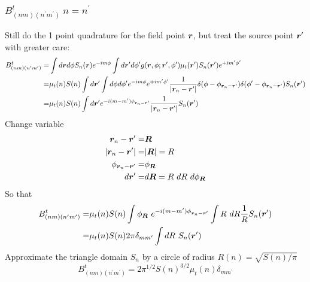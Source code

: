 \documentclass [10pt,letterpaper]{article}
\renewcommand{\vec}{\vectorsym}
\begin{document}
\subsubsection{$B^t_{(n m)(n^\prime m^\prime)} \ n=n^\prime$}
\label{subsub:Btnmnpmp-diagonal}
Still do the 1 point quadrature for the field point $\vec{r}$, but treat the source point $\vec{r}^\prime$ with greater care:
\begin{equation} \label{eq:der-Btnmnpmp-diagonal-1pt-1}
	\begin{split}
		B^t_{(n m)(n^\prime m^\prime)}
		=&
		\int d\vec{r} d\phi
		S_n(\vec{r})
		e^{-i m \phi}
		\int d\vec{r}^\prime d\phi^\prime
		g(\vec{r},\phi;\vec{r}^\prime,\phi^\prime)
		\mu_t(\vec{r}^\prime)
		S_n(\vec{r}^\prime)
		e^{+i m^\prime \phi^\prime}
		\\
		=&
		\mu_t(n) S(n)
		\int d\vec{r}^\prime
		\int d\phi d\phi^\prime
		e^{-i m \phi}
		e^{+i m^\prime \phi^\prime}
		\frac{1}{\lvert\vec{r}_n-\vec{r}^\prime\rvert}
		\delta(\phi-\phi_{\vec{r}_n-\vec{r}^\prime})
		\delta(\phi^\prime-\phi_{\vec{r}_n-\vec{r}^\prime})
		S_n(\vec{r}^\prime)
		\\
		=&
		\mu_t(n) S(n)
		\int d\vec{r}^\prime
		e^{-i (m-m^\prime) \phi_{\vec{r}_n-\vec{r}^\prime}}
		\frac{1}{\lvert\vec{r}_n-\vec{r}^\prime\rvert}
		S_n(\vec{r}^\prime)
	\end{split}
\end{equation}
Change variable
\begin{equation} \label{eq:der-change-variable}
	\begin{split}
		\vec{r}_n-\vec{r}^\prime
		=&
		\vec{R}
		\\
		\lvert \vec{r}_n-\vec{r}^\prime \rvert 
		=&
		\lvert \vec{R} \rvert = R
		\\
		\phi_{\vec{r}_n-\vec{r}^\prime}
		=&
		\phi_{\vec{R}}
		\\
		d\vec{r}^\prime
		=&
		d\vec{R}=R\ dR\ d\phi_{\vec{R}}
	\end{split}
\end{equation}
So that
\begin{equation} \label{eq:der-Btnmnpmp-diagonal-1pt-2}
	\begin{split}
		B^t_{(n m)(n^\prime m^\prime)}
		=& 
		\mu_t(n) S(n)
		\int \phi_{\vec{R}}\ 
		e^{-i (m-m^\prime) \phi_{\vec{r}_n-\vec{r}^\prime}}
		\int R\ dR 
		\frac{1}{R}
		S_n(\vec{r}^\prime)
		\\
		=&
		\mu_t(n) S(n)
		2\pi 
		\delta_{m m^\prime}
		\int dR\  
		S_n(\vec{r}^\prime)
	\end{split}
\end{equation}
Approximate the triangle domain $S_n$ by a circle of radius $R(n)=\sqrt{S(n)/\pi}$
\begin{equation} \label{eq:result-Btnmnpmp-diagonal-1pt}
	B^t_{(n m)(n^\prime m^\prime)}
	=
	2 
	\pi^{1/2}
	S(n)^{3/2}
	\mu_t(n) 
	\delta_{m m^\prime}
\end{equation}
\end{document}
